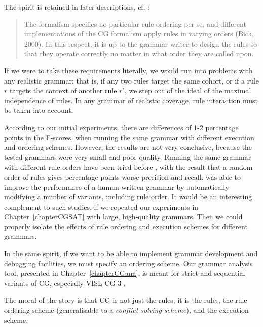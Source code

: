 \noindent The spirit is retained in later descriptions, cf. \cite{hulden2011cg_engine}:

\begin{quote} 
The formalism specifies no particular rule ordering per se, and different implementations of the CG formalism apply rules in varying orders (Bick, 2000).  In this respect, it is up to the grammar writer to design the rules so that they operate correctly no matter in what order they are called upon. 
\end{quote}

\noindent If we were to take these requirements literally, we would run into problems with any realistic grammar; that is, if any two rules target the same cohort, or if a rule $r$ targets the context of another rule $r'$, we step out of the ideal of the maximal independence of rules.
In any grammar of realistic coverage, rule interaction must be taken into account.

According to our initial experiments, there are differences of 1-2 percentage points in the F-scores, when running the same grammar with different execution and ordering schemes. However, the results are not very conclusive, because the tested grammars were very small and poor quality.
Running the same grammar with different rule orders have been tried before \cite{lager2001transformation}, with the result that a random order of  rules gives  percentage points worse precision and recall. 
\cite{bick2013tuning} was able to improve the performance of a human-written grammar by automatically modifying a number of variants, including rule order.
It would be an interesting complement to such studies, if we repeated our  experiments in Chapter~\ref{chapterCGSAT} with large, high-quality grammars.
Then we could properly isolate the effects of rule ordering and execution schemes for different grammars.

In the same spirit, if we want to be able to implement grammar development and debugging facilities, we must specify an ordering scheme. 
Our grammar analysis tool, presented in Chapter~\ref{chapterCGana}, 
is meant for strict and sequential variants of CG, especially VISL CG-3 \cite{vislcg3}. 

The moral of the story is that CG is not just the rules; it is the rules, the rule ordering scheme (generalisable to a \emph{conflict solving scheme}), and the execution scheme. 



 
